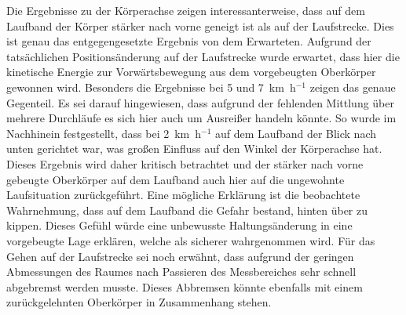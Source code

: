 Die Ergebnisse zu der Körperachse zeigen interessanterweise, dass auf dem Laufband der Körper stärker nach vorne geneigt ist als auf der Laufstrecke. Dies ist genau das entgegengesetzte Ergebnis von dem Erwarteten. Aufgrund der tatsächlichen Positionsänderung auf der Laufstrecke wurde erwartet, dass hier die kinetische Energie zur Vorwärtsbewegung aus dem vorgebeugten Oberkörper gewonnen wird. Besonders die Ergebnisse bei 5 und 7~km~h$^{-1}$ zeigen das genaue Gegenteil. Es sei darauf hingewiesen, dass aufgrund der fehlenden Mittlung über mehrere Durchläufe es sich hier auch um Ausreißer handeln könnte. So wurde im Nachhinein festgestellt, dass bei 2~km~h$^{-1}$ auf dem Laufband der Blick nach unten gerichtet war, was großen Einfluss auf den Winkel der Körperachse hat. Dieses Ergebnis wird daher kritisch betrachtet und der stärker nach vorne gebeugte Oberkörper auf dem Laufband auch hier auf die ungewohnte Laufsituation zurückgeführt. Eine mögliche Erklärung ist die beobachtete Wahrnehmung, dass auf dem Laufband die Gefahr bestand, hinten über zu kippen. Dieses Gefühl würde eine unbewusste Haltungsänderung in eine vorgebeugte Lage erklären, welche als sicherer wahrgenommen wird. Für das Gehen auf der Laufstrecke sei noch erwähnt, dass aufgrund der geringen Abmessungen des Raumes nach Passieren des Messbereiches sehr schnell abgebremst werden musste. Dieses Abbremsen könnte ebenfalls mit einem zurückgelehnten Oberkörper in Zusammenhang stehen.